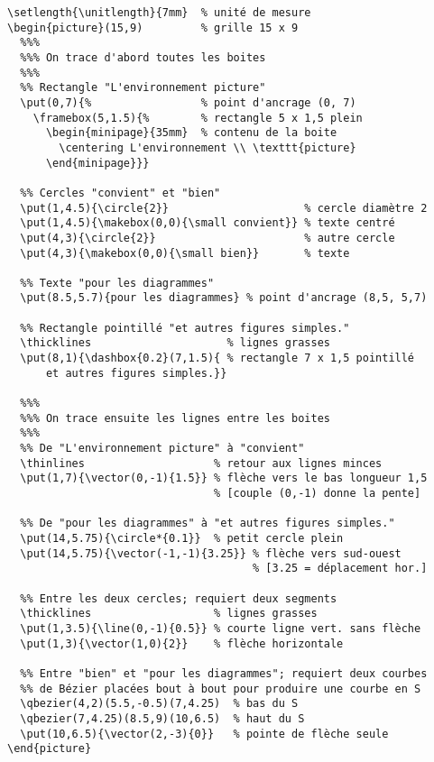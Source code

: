 \begingroup
  \small
\begin{lstlisting}
\setlength{\unitlength}{7mm}  % unité de mesure
\begin{picture}(15,9)         % grille 15 x 9
  %%%
  %%% On trace d'abord toutes les boites
  %%%
  %% Rectangle "L'environnement picture"
  \put(0,7){%                 % point d'ancrage (0, 7)
    \framebox(5,1.5){%        % rectangle 5 x 1,5 plein
      \begin{minipage}{35mm}  % contenu de la boite
        \centering L'environnement \\ \texttt{picture}
      \end{minipage}}}

  %% Cercles "convient" et "bien"
  \put(1,4.5){\circle{2}}                     % cercle diamètre 2
  \put(1,4.5){\makebox(0,0){\small convient}} % texte centré
  \put(4,3){\circle{2}}                       % autre cercle
  \put(4,3){\makebox(0,0){\small bien}}       % texte

  %% Texte "pour les diagrammes"
  \put(8.5,5.7){pour les diagrammes} % point d'ancrage (8,5, 5,7)

  %% Rectangle pointillé "et autres figures simples."
  \thicklines                     % lignes grasses
  \put(8,1){\dashbox{0.2}(7,1.5){ % rectangle 7 x 1,5 pointillé
      et autres figures simples.}}

  %%%
  %%% On trace ensuite les lignes entre les boites
  %%%
  %% De "L'environnement picture" à "convient"
  \thinlines                    % retour aux lignes minces
  \put(1,7){\vector(0,-1){1.5}} % flèche vers le bas longueur 1,5
                                % [couple (0,-1) donne la pente]

  %% De "pour les diagrammes" à "et autres figures simples."
  \put(14,5.75){\circle*{0.1}}  % petit cercle plein
  \put(14,5.75){\vector(-1,-1){3.25}} % flèche vers sud-ouest
                                      % [3.25 = déplacement hor.]

  %% Entre les deux cercles; requiert deux segments
  \thicklines                   % lignes grasses
  \put(1,3.5){\line(0,-1){0.5}} % courte ligne vert. sans flèche
  \put(1,3){\vector(1,0){2}}    % flèche horizontale

  %% Entre "bien" et "pour les diagrammes"; requiert deux courbes
  %% de Bézier placées bout à bout pour produire une courbe en S
  \qbezier(4,2)(5.5,-0.5)(7,4.25)  % bas du S
  \qbezier(7,4.25)(8.5,9)(10,6.5)  % haut du S
  \put(10,6.5){\vector(2,-3){0}}   % pointe de flèche seule
\end{picture}
\end{lstlisting}
\endgroup


